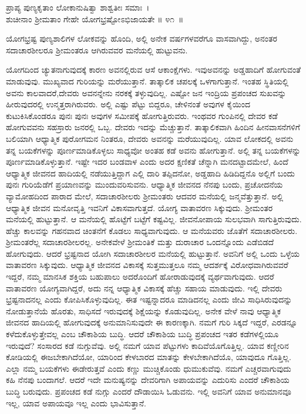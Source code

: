\begin{shloka}
ಪ್ರಾಪ್ಯ ಪುಣ್ಯಕೃತಾಂ ಲೋಕಾನುಷಿತ್ವಾ ಶಾಶ್ವತೀಃ ಸಮಾಃ~।\\ಶುಚೀನಾಂ ಶ‍್ರೀಮತಾಂ ಗೇಹೇ ಯೋಗಭ್ರಷ್ಟೋಽಭಿಜಾಯತೇ \hfill॥ ೪೧~॥
\end{shloka}

\begin{artha}
ಯೋಗಭ್ರಷ್ಟ ಪುಣ್ಯಶಾಲಿಗಳ ಲೋಕವನ್ನು ಹೊಂದಿ, ಅಲ್ಲಿ ಅನೇಕ ವರ್ಷಗಳವರೆಗೂ ವಾಸ\-ವಾಗಿದ್ದು, ಅನಂತರ ಸದಾಚಾರಶೀಲರೂ ಶ‍್ರೀಮಂತರೂ ಆಗಿರುವವರ ಮನೆಯಲ್ಲಿ ಹುಟ್ಟುವನು.
\end{artha}

ಯೋಗದಿಂದ ಚ್ಯುತನಾಗುವುದಕ್ಕೆ ಕಾರಣ ಅವನಲ್ಲಿರುವ ಆಸೆ ಆಕಾಂಕ್ಷೆಗಳು. ಇವು\break ಅವನನ್ನು ಅಡ್ಡಹಾದಿಗೆ ಹೋಗುವಂತೆ ಮಾಡುವುವು. ಮುಖ್ಯವಾದ ಗುರಿಯನ್ನು ಮರೆಯುತ್ತಾನೆ. ತಾತ್ಕಾಲಿಕ ಚಪಲಕ್ಕೆ ಒಳಗಾಗುತ್ತಾನೆ. ಇಂತಹ ಸ್ಥಿತಿಯಲ್ಲಿ ಅವನು ಕಾಲವಾದರೆ,\break ದೇವರು ಅವನನ್ನೇನು ನರಕಕ್ಕೆ ತಳ್ಳುವುದಿಲ್ಲ. ಎಷ್ಟೋ ಜನ ಇಂದ್ರಿಯ ಪ್ರಪಂಚದ ಸುಖವನ್ನು ಹೀರುವುದರಲ್ಲಿ ಉನ್ಮತ್ತರಾಗಿರುವರು. ಅಲ್ಲಿ ಎಷ್ಟು ಪೆಟ್ಟು ಬಿದ್ದರೂ, ಚೇಳಿನಂತೆ ಅವುಗಳ ಕೈಯಿಂದ ಕುಟುಕಿಸಿಕೊಂಡರೂ ಪುನಃ ಪುನಃ ಅವುಗಳ ಸಮೀಪಕ್ಕೆ ಹೋಗುತ್ತಿರುವರು. ಇಂಥವರ ಗುಂಪಿನಲ್ಲಿ ದೇವರ ಕಡೆ ಹೋಗುವವನು ಸಹಸ್ರಾರು ಜನರಲ್ಲಿ ಒಬ್ಬ. ದೇವರು ಇದನ್ನು ಮೆಚ್ಚುತ್ತಾನೆ. ತಾತ್ಕಾಲಿಕವಾಗಿ ಹಿಂದಿನ ಹೀನವಾಸನೆಗಳಿಗೆ ಬಲಿಯಾಗಿ ಆಧ್ಯಾತ್ಮಿಕ ಪುರೋಗಮನ ನಿಂತರೂ, ದೇವರು ಅವನನ್ನು ಮರೆಯುವುದಿಲ್ಲ. ಯಾವ ಲೋಕದಲ್ಲಿ ಅವನು ತನ್ನ ಬಯಕೆಗಳನ್ನು ಪೂರ್ಣಮಾಡಿಕೊಳ್ಳಲು ಸಾಧ್ಯವೋ ಅಂತಹ ಕಡೆ ಅವನು ಹೋಗುತ್ತಾನೆ. ಅಲ್ಲಿ ತನ್ನ ಬಯಕೆಗಳನ್ನು ಪೂರ್ಣಮಾಡಿಕೊಳ್ಳುತ್ತಾನೆ. ಇಷ್ಟೇ ಇದರ ಬಂಡವಾಳ ಎಂದು ಅದರ ಕ್ಷಣಿಕತೆ ಚೆನ್ನಾಗಿ ಮನದಟ್ಟಾದಮೇಲೆ, ಹಿಂದೆ ಆಧ್ಯಾತ್ಮಿಕ ಜೀವನದ ಹಾದಿಯಲ್ಲಿ ನಡೆಯುತ್ತಿದ್ದಾಗ ಎಲ್ಲಿ ದಾರಿ ತಪ್ಪಿದನೋ, ಅಡ್ಡಹಾದಿ ಹಿಡಿದಿದ್ದನೊ ಅಲ್ಲಿಗೆ ಬಂದು ಪುನಃ ಗುರಿಯೆಡೆಗೆ ಪ್ರಯಾಣವನ್ನು ಮುಂದುವರಿಸುವನು. ಆಧ್ಯಾತ್ಮಿಕ ಜೀವನದ ನೆನಪು ಬಂದು, ಪ್ರಚೋದನೆಯ ವ್ಯಾಮೋಹದಿಂದ ಪಾರಾದ ಮೇಲೆ, ಸದಾಚಾರಶೀಲರು ಶ‍್ರೀಮಂತರು ಆದವರ ಮನೆಯಲ್ಲಿ ಜನ್ಮವೆತ್ತುತ್ತಾನೆ. ಅಲ್ಲಿ ಆಧ್ಯಾತ್ಮಿಕ ಜೀವನ ಮನೋವೃತ್ತಿ ಇವನಿಗೆ ವಿಕಾಸವಾಗುತ್ತದೆ. ಯೋಗ್ಯ ವಾತಾವರಣ ಸಿಕ್ಕುವುದು. ಶ‍್ರೀಮಂತರ ಮನೆಯಲ್ಲಿ ಹುಟ್ಟುತ್ತಾನೆ. ಆ ಮನೆಯಲ್ಲಿ ಹೊಟ್ಟೆಗೆ ಬಟ್ಟೆಗೆ ಕಷ್ಟವಿಲ್ಲ. ಜೀವನೋಪಾಯ ಸುಲಭವಾಗಿ ಸಾಗುತ್ತಿರುವುದು. ಹೆಚ್ಚು ಕಾಲವನ್ನು ಗಹನವಾದ ಚಿಂತನೆಗೆ ಕೊಡಲು ಸಾಧ್ಯವಾಗುವುದು. ಆ ಮನೆಯವರು ಜೊತೆಗೆ ಸದಾಚಾರಶೀಲರು. ಶ‍್ರೀಮಂತರೆಲ್ಲ ಸದಾಚಾರಶೀಲರಲ್ಲ. ಅನೇಕವೇಳೆ ಶ‍್ರೀಮಂತಿಕೆ ಮತ್ತು ದುರಾಚಾರ ಒಂದನ್ನೊಂದು ಎಡೆಬಿಡದೆ ಹೋಗುವುದು. ಆದರೆ ಭ್ರಷ್ಟನಾದ ಯೋಗಿ ಸದಾಚಾರಶೀಲರ ಮನೆಯಲ್ಲಿ ಹುಟ್ಟುತ್ತಾನೆ. ಅವನಿಗೆ ಅಲ್ಲಿ ಒಂದು ಒಳ್ಳೆಯ ವಾತಾವರಣ ಸಿಕ್ಕುವುದು. ಆಧ್ಯಾತ್ಮಿಕ ಜೀವನದ ವಿಕಾಸಕ್ಕೆ ಸುತ್ತಮುತ್ತಲೂ ನಮ್ಮ ಆದರ್ಶಕ್ಕೆ ವಿರೋಧವಾಗಿರುವವರೆ ಇದ್ದರೆ, ನಮ್ಮ ಮಾನಸಿಕ ಶಕ್ತಿಯ ಬಹುಪಾಲು ಅದರೊಂದಿಗೆ ಹೋರಾಡುವುದಕ್ಕೆ ವ್ಯರ್ಥವಾಗುವುದು. ಆದರೆ ವಾತಾವರಣ ಯೋಗ್ಯವಾಗಿದ್ದರೆ, ಅದು ನನ್ನ ಆಧ್ಯಾತ್ಮಿಕ ವಿಕಾಸಕ್ಕೆ ಹೆಚ್ಚು ಸಹಾಯ ಮಾಡುವುದು. ಇಲ್ಲಿ ದೇವರು ಭ್ರಷ್ಟನಾದನಲ್ಲ ಎಂದು ಕೋಪಿಸಿಕೊಳ್ಳುವುದಿಲ್ಲ. ಈತ ಇಷ್ಟನ್ನಾದರೂ ಮಾಡಿದನಲ್ಲ ಎಂದು ಜೀವಿ ಸಾಧಿಸಿರುವುದನ್ನು ನೋಡುತ್ತಾನೆಯೆ ಹೊರತು, ಸಾಧಿಸದೆ ಇರುವುದಕ್ಕೆ ಶಿಕ್ಷೆಯನ್ನು ಕೊಡುವುದಿಲ್ಲ. ಅನೇಕ ವೇಳೆ ನಾವು ಆಧ್ಯಾತ್ಮಿಕ ಜೀವನದ ಹಾದಿಯಲ್ಲಿ ಹೋಗುವುದಕ್ಕೆ ಅನುಮಾನಿಸುವುದೇ ಈ ಕಾರಣಕ್ಕಾಗಿ. ನಮಗೆ ಗುರಿ ಸಿಕ್ಕದೆ ಇದ್ದರೆ, ಎರಡನ್ನೂ ಕಳೆದುಕೊಳ್ಳು\-ತ್ತೇವಲ್ಲ ಎಂಬ ಚೌಕಾಶಿಯ ಬುದ್ಧಿ. ಆದರೆ ಚೌಕಾಶಿಯ ಬುದ್ಧಿ ಪ್ರಪಂಚದ ಇತರ ಕಡೆಗಳಲ್ಲಿಯೂ ಇರುವುದೆ? ಸಂಸಾರದ ಕಡೆ ನುಗ್ಗುವೆವು. ಅಲ್ಲಿ ನಮಗೆ ಯಾವ ಪೆಟ್ಟುಗಳು ಕಾದಿವೆಯೊ\break ಗೊತ್ತಿಲ್ಲ. ಯಾವ ಕಣ್ಣೀರಿನ ಕೋಡಿಯಲ್ಲಿ ಈಜಬೇಕಾಗಿದೆಯೋ, ಯಾರಿಂದ ಕೇಳಬಾರದ ಮಾತನ್ನು ಕೇಳಬೇಕಾಗಿದೆಯೊ, ಯಾವುದೂ ಗೊತ್ತಿಲ್ಲ. ಎಲ್ಲಾ ನಮ್ಮ ಬಯಕೆಗಳು ಈಡೇರುತ್ತವೆ ಎಂದು ಕಣ್ಣು ಮುಚ್ಚಿಕೊಂಡು ಧುಮುಕುವೆವು. ನಮಗೆ ಎಚ್ಚರವಾಗುವುದು ಕಹಿ ನೆನಪು ಬಂದಾಗಲೆ. ಆದರೆ ಇದೇ ಮನುಷ್ಯನನ್ನು ದೇವರಿಗಾಗಿ ಅಪಾಯವನ್ನು ಎದುರಿಸು ಎಂದರೆ ಚೌಕಾಶಿಯ ಬುದ್ಧಿ ಬರುವುದು. ಪ್ರಪಂಚದ ಕಡೆ ನುಗ್ಗು ಎಂದರೆ ದೌಡಾಯಿಸಿ ಓಡುವನು. ಇಲ್ಲಿ ಅವನಿಗೆ ಯಾವ ಅನುಮಾನವೂ ಇಲ್ಲ, ಯಾವ ಅಪಾಯವೂ ಇಲ್ಲ ಎಂದು ಭಾವಿಸುತ್ತಾನೆ.

